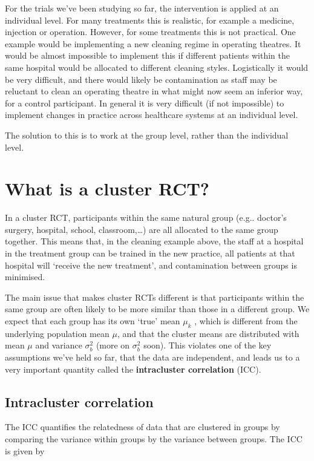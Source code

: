 \documentclass[
  openany]{book}
\theoremstyle{definition}
\theoremstyle{definition}
\theoremstyle{definition}
\theoremstyle{definition}
\theoremstyle{remark}
\begin{document}
For the trials we've been studying so far, the intervention is applied at an individual level. For many treatments this is realistic, for example a medicine, injection or operation. However, for some treatments this is not practical. One example would be implementing a new cleaning regime in operating theatres. It would be almost impossible to implement this if different patients within the same hospital would be allocated to different cleaning styles. Logistically it would be very difficult, and there would likely be contamination as staff may be reluctant to clean an operating theatre in what might now seem an inferior way, for a control participant. In general it is very difficult (if not impossible) to implement changes in practice across healthcare systems at an individual level.

The solution to this is to work at the group level, rather than the individual level.

\section{What is a cluster RCT?}\label{what-is-a-cluster-rct}

In a cluster RCT, participants within the same natural group (e.g.. doctor's surgery, hospital, school, classroom,\ldots) are all allocated to the same group together. This means that, in the cleaning example above, the staff at a hospital in the treatment group can be trained in the new practice, all patients at that hospital will `receive the new treatment', and contamination between groups is minimised.

The main issue that makes cluster RCTs different is that participants within the same group are often likely to be more similar than those in a different group. We expect that each group has its own `true' mean \(\mu_k\) , which is different from the underlying population mean \(\mu\), and that the cluster means are distributed with mean \(\mu\) and variance \(\sigma^2_b\) (more on \(\sigma^2_b\) soon). This violates one of the key assumptions we've held so far, that the data are independent, and leads us to a very important quantity called the \textbf{intracluster correlation} (ICC).

\subsection{Intracluster correlation}\label{intracluster-correlation}

The ICC quantifies the relatedness of data that are clustered in groups by comparing the variance within groups by the variance between groups. The ICC is given by
\end{document}

